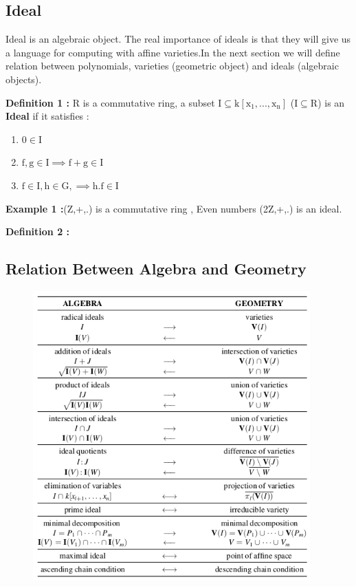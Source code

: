 \documentclass[11pt]{article}
\begin{document}
\subsection{Ideal}
Ideal is an algebraic object. The real importance of ideals is that they will give us a language for computing with affine varieties.In the next section we will define relation between polynomials, varieties (geometric object) and ideals (algebraic objects).\newline

\textbf{Definition 1 :}\newline
R is a commutative ring, a subset $\mathrm{ I \subseteq k[x_1,...,x_n] }$ ($\mathrm{ I \subseteq R }$) is an \textbf{Ideal} if it satisfies :
\begin{enumerate}
\item $\mathrm{0 \in I}$
\item $\mathrm{f,g \in I \implies f+g \in I}$
\item $\mathrm{f \in I, h \in G,\implies h.f \in I  }$
\end{enumerate}

\textbf{Example 1 :}\newline  (Z,+,.) is a commutative ring , Even numbers (2Z,+,.) is an ideal.\newline


\textbf{Definition 2 :}\newline




\subsection{Relation Between Algebra and Geometry}

\begin{figure}[H]
  \begin{center}
    \includegraphics[width=0.95\textwidth]{algebra_geometry.png}
    \caption{}
    \label{fig: }
  \end{center}
\end{figure}
\end{document}
